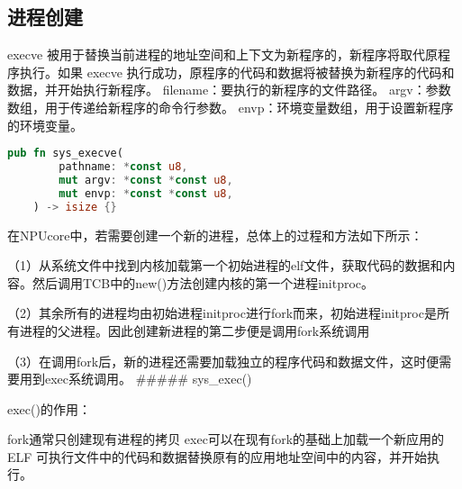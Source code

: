 \subsection{进程创建}
execve 被用于替换当前进程的地址空间和上下文为新程序的，新程序将取代原程序执行。如果 execve 执行成功，原程序的代码和数据将被替换为新程序的代码和数据，并开始执行新程序。
filename：要执行的新程序的文件路径。
argv：参数数组，用于传递给新程序的命令行参数。
envp：环境变量数组，用于设置新程序的环境变量。
\begin{lstlisting}[language={Rust}, label={code:forktest},
    caption={forktest.rs}]
    pub fn sys_execve(
        pathname: *const u8,
        mut argv: *const *const u8,
        mut envp: *const *const u8,
    ) -> isize {}
\end{lstlisting}
在NPUcore中，若需要创建一个新的进程，总体上的过程和方法如下所示：

（1）从系统文件中找到内核加载第一个初始进程的elf文件，获取代码的数据和内容。然后调用TCB中的new()方法创建内核的第一个进程initproc。

（2）其余所有的进程均由初始进程initproc进行fork而来，初始进程initproc是所有进程的父进程。因此创建新进程的第二步便是调用fork系统调用

（3）在调用fork后，新的进程还需要加载独立的程序代码和数据文件，这时便需要用到exec系统调用。
##### sys_exec()

exec()的作用：

fork通常只创建现有进程的拷贝
exec可以在现有fork的基础上加载一个新应用的 ELF 可执行文件中的代码和数据替换原有的应用地址空间中的内容，并开始执行。


